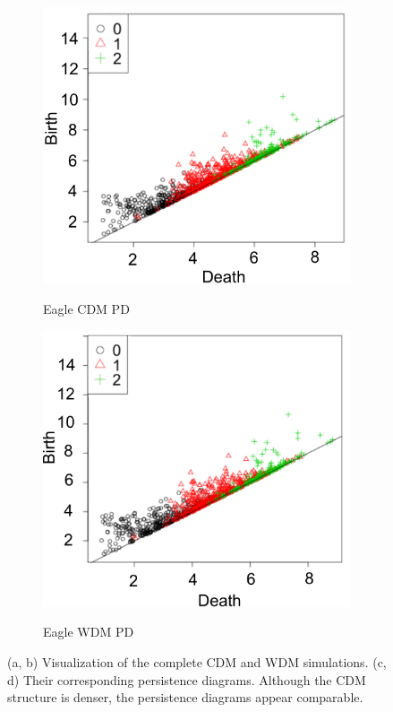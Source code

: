 \documentclass[12pt]{article}
\begin{document}
\begin{figure}[htp!]
    \begin{subfigure}{0.24\textwidth}
    \caption{Eagle CDM PD}
  \includegraphics[width=\linewidth]{cdmdiag.pdf}
    \label{fig:eagleDiagsC}
  \end{subfigure}
    \begin{subfigure}{0.24\textwidth}
        \caption{Eagle WDM PD}
  \includegraphics[width=\linewidth]{wdmdiag.pdf}
    \label{fig:eagleDiagsD}
  \end{subfigure}
    \caption{(a, b) Visualization of the complete CDM and WDM simulations. (c, d) Their corresponding persistence diagrams. Although the CDM structure is denser, the persistence diagrams appear comparable.} 
\end{figure}
\end{document}
